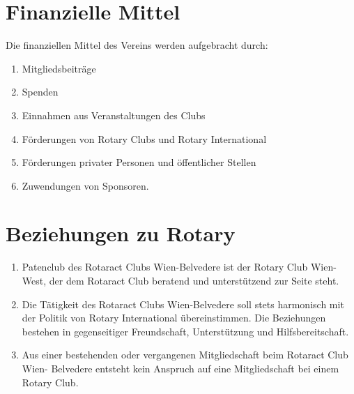 \documentclass{article}
\begin{document}
\section{Finanzielle Mittel}
Die finanziellen Mittel des Vereins werden aufgebracht durch:
\begin{enumerate}  %
    \item Mitgliedsbeiträge
    \item Spenden
    \item Einnahmen aus Veranstaltungen des Clubs
    \item Förderungen von Rotary Clubs und Rotary International
    \item Förderungen privater Personen und öffentlicher Stellen
    \item Zuwendungen von Sponsoren.
\end{enumerate}

\section{Beziehungen zu Rotary}
\begin{enumerate}
    \item Patenclub des Rotaract Clubs Wien-Belvedere ist der Rotary Club Wien-West, der dem Rotaract Club beratend und unterstützend zur Seite steht.
    \item Die Tätigkeit des Rotaract Clubs Wien-Belvedere soll stets harmonisch mit der Politik von Rotary International übereinstimmen. Die Beziehungen bestehen in gegenseitiger Freundschaft, Unterstützung und Hilfsbereitschaft.
    \item Aus einer bestehenden oder vergangenen Mitgliedschaft beim Rotaract Club Wien- Belvedere entsteht kein Anspruch auf eine Mitgliedschaft bei einem Rotary Club.
\end{enumerate}
\end{document}
